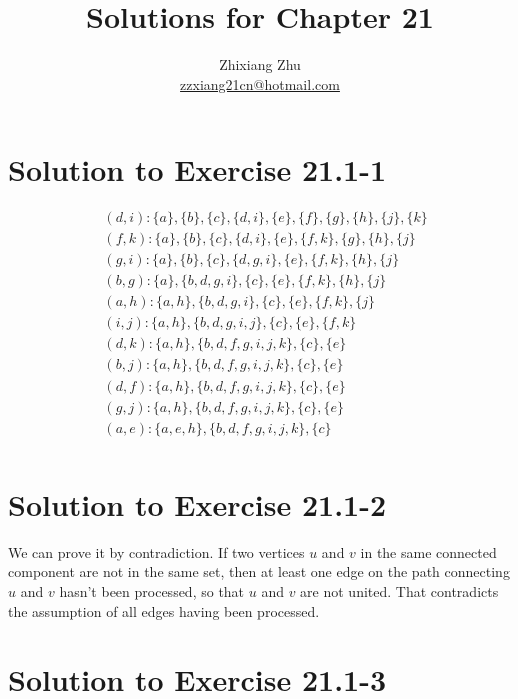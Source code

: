 \documentclass[a4paper, fleqn]{article}
\title{Solutions for Chapter 21}
\author{Zhixiang Zhu
\\\href{mailto:zzxiang21cn@hotmail.com}{zzxiang21cn@hotmail.com}}
\begin{document}
\maketitle

\section*{Solution to Exercise 21.1-1}

\begin{align*}
&(d, i): \{a\}, \{b\}, \{c\}, \{d, i\}, \{e\}, \{f\}, \{g\}, \{h\}, \{j\}, \{k\} \\
&(f, k): \{a\}, \{b\}, \{c\}, \{d, i\}, \{e\}, \{f, k\}, \{g\}, \{h\}, \{j\} \\
&(g, i): \{a\}, \{b\}, \{c\}, \{d, g, i\}, \{e\}, \{f, k\}, \{h\}, \{j\} \\
&(b, g): \{a\}, \{b, d, g, i\}, \{c\}, \{e\}, \{f, k\}, \{h\}, \{j\} \\
&(a, h): \{a, h\}, \{b, d, g, i\}, \{c\}, \{e\}, \{f, k\}, \{j\} \\
&(i, j): \{a, h\}, \{b, d, g, i, j\}, \{c\}, \{e\}, \{f, k\} \\
&(d, k): \{a, h\}, \{b, d, f, g, i, j, k\}, \{c\}, \{e\} \\
&(b, j): \{a, h\}, \{b, d, f, g, i, j, k\}, \{c\}, \{e\} \\
&(d, f): \{a, h\}, \{b, d, f, g, i, j, k\}, \{c\}, \{e\} \\
&(g, j): \{a, h\}, \{b, d, f, g, i, j, k\}, \{c\}, \{e\} \\
&(a, e): \{a, e, h\}, \{b, d, f, g, i, j, k\}, \{c\} \\
\end{align*}






\section*{Solution to Exercise 21.1-2}

We can prove it by contradiction. If two vertices $u$ and $v$ in the
same connected component are not in the same set, then at least one
edge on the path connecting $u$ and $v$ hasn't been processed, so that
$u$ and $v$ are not united. That contradicts the assumption of all
edges having been processed.






\section*{Solution to Exercise 21.1-3}
\end{document}
